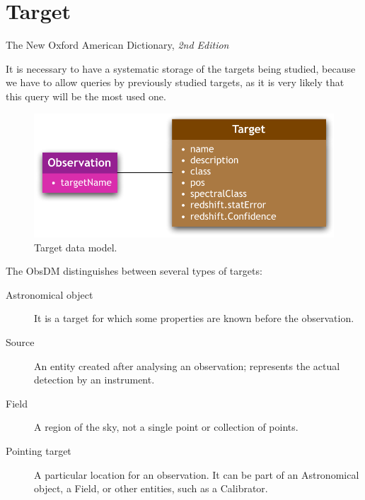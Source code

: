 


	\section{Target} %
	\label{subTargetDesc}
		{The New  Oxford American Dictionary, \emph{2nd Edition}}
		
		
		\noindent
		It is necessary to have a systematic storage of the targets
		being studied, because we have to allow queries by
		previously studied targets, as it is very likely that
		this query will be the most used one.
		
		\begin{figure}[tbp]
			\begin{center}
				\includegraphics[width=0.5\columnwidth]
				{fig/Target-DM}
			\end{center}
			\caption[Target data model]{Target data model.}
			\label{figTargetDataModel}
		\end{figure}

		The ObsDM distinguishes between
		several types of targets:

		\begin{description}
			\item[Astronomical object] It is a target for which
			some properties are known before the observation.
			
			 \item[Source] An entity created after analysing an
			observation; represents the actual detection by an
			instrument.
			
			 \item[Field] A region of the sky, not a single point
			or collection of points.
			
			 \item[Pointing target] A particular location for an
			observation. It can be part of an Astronomical object,
			a Field, or other entities, such as a Calibrator.
		\end{description}

